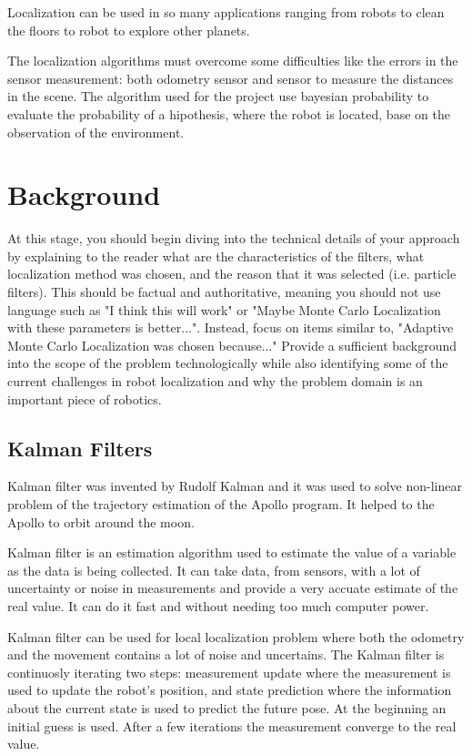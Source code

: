 \documentclass[10pt,journal,compsoc]{IEEEtran}
\begin{document}
Localization can be used in so many applications ranging from robots to clean the floors to robot to explore other planets.

The localization algorithms must overcome some difficulties like the errors in the sensor measurement: both odometry sensor and sensor to measure the distances in the scene. The algorithm used for the project use bayesian probability to evaluate the probability of a hipothesis, where the robot is located, base on the observation of the environment.


\section{Background}


At this stage, you should begin diving into the technical details of your approach by explaining to the reader what are the characteristics of the filters, what localization method was chosen, and the reason that it was selected (i.e. particle filters). 
This should be factual and authoritative, meaning you should not use language such as "I think this will work" or "Maybe Monte Carlo Localization with these parameters is better...". Instead, focus on items similar to, "Adaptive Monte Carlo Localization was chosen because..."
Provide a sufficient background into the scope of the problem technologically while also identifying some of the current challenges in robot localization and why the problem domain is an important piece of robotics.\cite{lamport1994latex}

\subsection{Kalman Filters}

Kalman filter was invented by Rudolf Kalman and it was used to solve non-linear problem of the trajectory estimation of the Apollo program. It helped to the Apollo to orbit around the moon. 

Kalman filter is an estimation algorithm used to estimate the value of a variable as the data is being collected. It can take data, from sensors, with a lot of uncertainty or noise in measurements and provide a very accuate estimate of the real value. It can do it fast and without needing too much computer power. 

Kalman filter can be used for local localization problem where both the odometry and the movement contains a lot of noise and uncertains. The Kalman filter is continuosly iterating two steps: measurement update where the measurement is used to update the robot's position, and state prediction where the information about the current state is used to predict the future pose. At the beginning an initial guess is used. After a few iterations the measurement converge to the real value.
\end{document}
